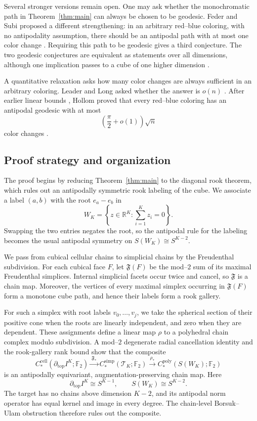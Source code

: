 \documentclass[reqno,12pt]{amsart}
\theoremstyle{definition}
\newcommand{\F}{\mathbb F_2}
\newcommand{\cell}{\mathrm{cell}}
\begin{document}
Several stronger versions remain open.  One may ask whether the
monochromatic path in Theorem~\ref{thm:main} can always be chosen to be
geodesic.  Feder and Subi proposed a different strengthening: in an
arbitrary red--blue coloring, with no antipodality assumption, there
should be an antipodal path with at most one color change
\cite{FederSubi}.  Requiring this path to be geodesic gives a third
conjecture.  The two geodesic conjectures are equivalent as statements
over all dimensions, although one implication passes to a cube of one
higher dimension \cite{LeaderLong,Soltesz}.

A quantitative relaxation asks how many color changes are always
sufficient in an arbitrary coloring.  Leader and Long asked whether
the answer is \(o(n)\) \cite{LeaderLong}.  After earlier linear bounds
\cite{Dvorak,KirchwegerEtAl}, Hollom proved that every red--blue
coloring has an antipodal geodesic with at most
\[
 \left(\frac{\pi}{2}+o(1)\right)\sqrt n
\]
color changes \cite{Hollom}.


\subsection{Proof strategy and organization}

The proof begins by reducing Theorem~\ref{thm:main} to the diagonal
rook theorem, which rules out an antipodally symmetric rook labeling
of the cube.  We associate a label \((a,b)\) with the root
\(e_a-e_b\) in
\[
 W_K=\left\{z\in\mathbb R^K:\sum_{i=1}^Kz_i=0\right\}.
\]
Swapping the two entries negates the root, so the antipodal rule for
the labeling becomes the usual antipodal symmetry on
\(S(W_K)\cong S^{K-2}\).

We pass from cubical cellular chains to simplicial chains by the
Freudenthal subdivision.  For each cubical face \(F\), let
\(\mathfrak F(F)\) be the mod--\(2\) sum of its maximal Freudenthal
simplices.  Internal simplicial facets occur twice and cancel, so
\(\mathfrak F\) is a chain map.  Moreover, the vertices of every
maximal simplex occurring in \(\mathfrak F(F)\) form a monotone cube
path, and hence their labels form a rook gallery.

For such a simplex with root labels \(v_0,\ldots,v_j\), we take the
spherical section of their positive cone when the roots are linearly
independent, and zero when they are dependent.  These assignments
define a linear map \(\rho\) to a polyhedral chain complex modulo
subdivision.  A mod--\(2\) degenerate radial cancellation identity and
the rook-gallery rank bound show that the composite
\[
 C_*^{\cell}(\partial_{\mathrm{top}}I^K;\F)
 \xrightarrow{\ \mathfrak F_*\ }
 C_*^{\mathrm{simp}}(\mathcal T_K;\F)
 \xrightarrow{\ \rho_*\ }
 C_*^{\mathrm{poly}}(S(W_K);\F)
\]
is an antipodally equivariant, augmentation-preserving chain map.
Here
\[
 \partial_{\mathrm{top}}I^K\cong S^{K-1},
 \qquad
 S(W_K)\cong S^{K-2}.
\]
The target has no chains above dimension \(K-2\), and its antipodal
norm operator has equal kernel and image in every degree.  The
chain-level Borsuk--Ulam obstruction therefore rules out the
composite.
\end{document}
